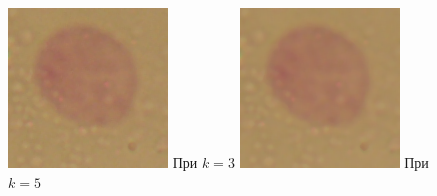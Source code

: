 \begin{figure}[t!]
	\includegraphics[width=0.95\linewidth]{Figures/Chapter2/1b.png}
	При \(k = 3\)
	\endminipage\hfill
	\centering	
	\includegraphics[width=0.95\linewidth]{Figures/Chapter2/1c.png}
	При \(k = 5\)
	\endminipage\hfill
	\centering	

\end{figure}
